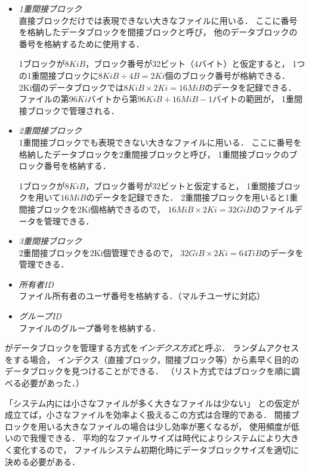 \begin{itemize}
\item \emph{1重間接ブロック}\\
  直接ブロックだけでは表現できない大きなファイルに用いる．
  ここに番号を格納したデータブロックを間接ブロックと呼び，
  他のデータブロックの番号を格納するために使用する．

  1ブロックが$8KiB$，ブロック番号が32ビット（4バイト）と仮定すると，
  1つの1重間接ブロックに$8KiB \div 4B = 2Ki$個のブロック番号が格納できる．
  2Ki個のデータブロックでは$8KiB \times 2Ki = 16MiB$のデータを記録できる．
  ファイルの第$96Ki$バイトから第$96KiB + 16MiB - 1$バイトの範囲が，
  1重間接ブロックで管理される．

\item \emph{2重間接ブロック}\\
  1重間接ブロックでも表現できない大きなファイルに用いる．
  ここに番号を格納したデータブロックを2重間接ブロックと呼び，
  1重間接ブロックのブロック番号を格納する．

  1ブロックが$8KiB$，ブロック番号が32ビットと仮定すると，
  1重間接ブロックを用いて$16MiB$のデータを記録できた．
  2重間接ブロックを用いると1重間接ブロックを2Ki個格納できるので，
  $16MiB \times 2Ki = 32GiB$のファイルデータを管理できる．

\item \emph{3重間接ブロック}\\
  2重間接ブロックを2Ki個管理できるので，
  $32GiB \times 2Ki = 64TiB$のデータを管理できる．

\item \emph{所有者ID}\\
  ファイル所有者のユーザ番号を格納する．（マルチユーザに対応）

\item \emph{グループID}\\
  ファイルのグループ番号を格納する．
\end{itemize}

\inode がデータブロックを管理する方式を\emph{インデクス方式}と呼ぶ．
ランダムアクセスをする場合，
インデクス（直接ブロック，間接ブロック等）から素早く目的の
データブロックを見つけることができる．
（リスト方式ではブロックを順に調べる必要があった．）

「システム内には小さなファイルが多く大きなファイルは少ない」
との仮定が成立てば，小さなファイルを効率よく扱えるこの方式は合理的である．
間接ブロックを用いる大きなファイルの場合は少し効率が悪くなるが，
使用頻度が低いので我慢できる．
平均的なファイルサイズは時代によりシステムにより大きく変化するので，
ファイルシステム初期化時にデータブロックサイズを適切に決める必要がある．

